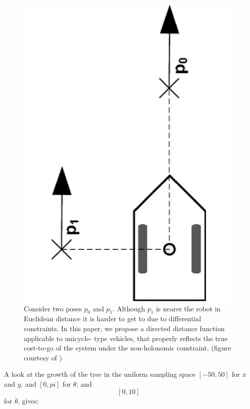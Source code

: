\begin{figure}
  \includegraphics[scale=.3,angle=-90]{figures/rrtfunnel/non-holonomic-vehicle-euclidean-weakness}
  \caption{Consider two poses \(p_0\) and \(p_1\). Although \(p_1\) is nearer
    the robot in Euclidean distance it is harder to get to due to differential
    constraints. In this paper, we propose a directed distance function
    applicable to unicycle- type vehicles, that properly reflects the true
    cost-to-go of the system under the non-holonomic constraint. (figure
    courtesy of \cite{parkFeedbackMotionPlanning2015})}
\label{fig:non-holonomic-vehicle-euclidean-weakness}
\end{figure}

A look at the growth of the tree in the uniform sampling space \([-50,50]\) for
\(x\) and \(y\), and \([0,pi]\) for \(\theta\), and \[[0,10]\] for
\(\dot{\theta}\), gives:

